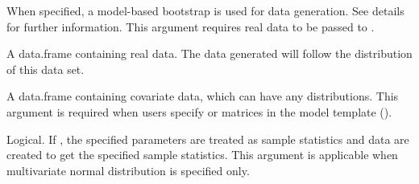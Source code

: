 \documentclass[a4paper]{book}
\begin{document}
\begin{Arguments}
\begin{ldescription}
\item[\code{modelBoot}] 
When specified, a model-based bootstrap is used for data generation. See details for further information. This argument requires real data to be passed to .

\item[\code{realData}] 
A data.frame containing real data. The data generated will follow the distribution of this data set.

\item[\code{covData}]  
A data.frame containing covariate data, which can have any distributions. This argument is required when users specify  or  matrices in the model template ().

\item[\code{empirical}]  
Logical. If , the specified parameters are treated as sample statistics and data are created to get the specified sample statistics. This argument is applicable when multivariate normal distribution is specified only.

\end{ldescription}
\end{Arguments}
%
\end{document}
